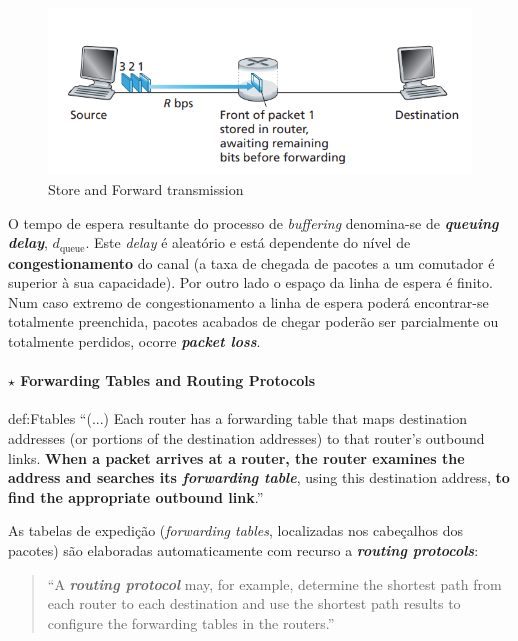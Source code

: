 \vspace{-1.2em}
\begin{figure}[H]
    \centering
    \includegraphics[width = 0.8\linewidth]{img/1/store-and-forward.png}
    \caption{Store and Forward transmission}
    \label{fig:Store-For}
\end{figure}

\noindent O tempo de espera resultante do processo de \textit{buffering} denomina-se de \textbf{\textit{queuing delay}}, $d_{\text{queue}}$. Este \textit{delay} é aleatório e está dependente do nível de \textbf{congestionamento} do canal (a taxa de chegada de pacotes a um comutador é superior à sua capacidade). Por outro lado o espaço da linha de espera é finito. Num caso extremo de congestionamento a linha de espera poderá encontrar-se totalmente preenchida, pacotes acabados de chegar poderão ser parcialmente ou totalmente perdidos, ocorre \textit{\textbf{packet loss}}.

\paragraph[1.2.2.2 Forwarding Tables and Routing Protocols]{$\pmb{\star}$ Forwarding Tables and Routing Protocols}\mbox{}

\begin{theo}{def:Ftables}\label{def:Ftables}
    ``(...) Each router has a forwarding table that maps destination addresses (or portions of the destination addresses) to that router’s outbound links. \textbf{When a packet arrives at a router, the router examines the address and searches its \textit{forwarding table}}, using this destination address, \textbf{to find the appropriate outbound link}.''\cite{Kurose2017}
\end{theo}
\clearpage
As tabelas de expedição (\textit{forwarding tables}, localizadas nos cabeçalhos dos pacotes) são elaboradas automaticamente com recurso a \textit{\textbf{routing protocols}}:

\begin{quote}
    ``A \textbf{\textit{routing protocol}} may, for example, determine the shortest path from each router to each destination and use the shortest path results to configure the forwarding tables in the routers.''\cite{Kurose2017}
\end{quote}


